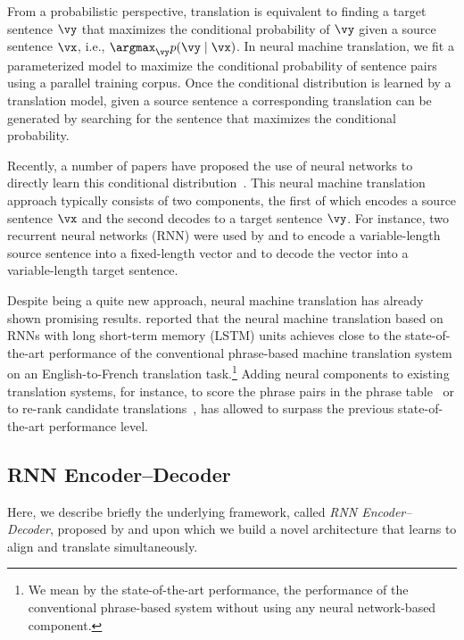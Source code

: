 From a probabilistic perspective, translation is equivalent to finding a target
sentence $\vy$ that maximizes the conditional probability of $\vy$ given a
source sentence $\vx$, i.e., $\argmax_{\vy} p(\vy \mid \vx)$.  In neural
machine translation, we fit a parameterized model to maximize the conditional
probability of sentence pairs using a parallel training corpus. Once the
conditional distribution is learned by a translation model, given a source
sentence a corresponding translation can be generated by searching for the
sentence that maximizes the conditional probability.

Recently, a number of papers have proposed the use of neural networks to
directly learn this conditional distribution~\citep[see,
e.g.,][]{Kalchbrenner2013,Cho2014,Sutskever2014,Cho2014a,Forcada1997}. This
neural machine translation approach typically consists of two components, the
first of which encodes a source sentence $\vx$ and the second decodes to a
target sentence $\vy$. For instance, two recurrent neural networks (RNN) were
used by \citep{Cho2014} and \citep{Sutskever2014} to encode a variable-length
source sentence into a fixed-length vector and to decode the vector into a
variable-length target sentence.

Despite being a quite new approach, neural machine translation has already
shown promising results. \citet{Sutskever2014} reported that the neural machine
translation based on RNNs with long short-term memory (LSTM) units achieves
close to the state-of-the-art performance of the conventional phrase-based
machine translation system on an English-to-French translation task.\footnote{
    We mean by the state-of-the-art performance, the performance of the
    conventional phrase-based system without using any neural network-based
    component.
} 
Adding neural components to existing translation systems, for instance,
to score the phrase pairs in the phrase table~\citep{Cho2014} or to re-rank
candidate translations~\citep{Sutskever2014}, has allowed to
surpass the previous state-of-the-art performance level.

\subsection{RNN Encoder--Decoder}

Here, we describe briefly the underlying framework, called {\it RNN
Encoder--Decoder}, proposed by \citet{Cho2014} and \citet{Sutskever2014} upon
which we build a novel architecture that learns to align and translate
simultaneously.


